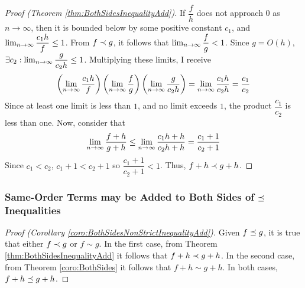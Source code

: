 \begin{proof}[Proof (Theorem \ref{thm:BothSidesInequalityAdd})]
	If $\dfrac{f}{h}$ does not approach $0$ as $n \to \infty$, then it is bounded below by some positive constant $c_1$, and $\lim_{n \to \infty} \dfrac{c_1 h}{f} \leq 1$. From $f \prec g$, it follows that $\lim_{n \to \infty} \dfrac{f}{g} < 1$. Since $g = O(h)$, $\exists c_2 : \lim_{n \to \infty} \dfrac{g}{c_2 h} \leq 1$. Multiplying these limits, I receive
	\begin{align*}
	\left( \lim_{n \to \infty} \frac{c_1 h}{f} \right) \left( \lim_{n \to \infty} \dfrac{f}{g} \right) \left( \lim_{n \to \infty} \dfrac{g}{c_2 h} \right) = \lim_{n \to \infty} \frac{c_1 h}{c_2 h} = \frac{c_1}{c_2}
	\end{align*}
	Since at least one limit is less than $1$, and no limit exceeds $1$, the product $\dfrac{c_1}{c_2}$ is less than one. Now, consider that
	\begin{align*}
	\lim_{n \to \infty} \frac{f + h}{g + h} \leq \lim_{n \to \infty} \frac{c_1 h + h}{c_2 h + h} = \frac{c_1 + 1}{c_2 + 1}
	\end{align*}
	Since $c_1 < c_2$, $c_1 + 1 < c_2 + 1$ so $\dfrac{c_1 + 1}{c_2 + 1} < 1$. Thus, $f + h \prec g + h$.
\end{proof}

\subsubsection{Same-Order Terms may be Added to Both Sides of $\preceq$ Inequalities}

\begin{proof}[Proof (Corollary \ref{coro:BothSidesNonStrictInequalityAdd})]
	Given $f \preceq g$, it is true that either $f \prec g$ or $f \sim g$. In the first case, from Theorem \ref{thm:BothSidesInequalityAdd} it follows that $f + h \prec g + h$. In the second case, from Theorem \ref{coro:BothSides} it follows that $f + h \sim g + h$. In both cases, $f + h \preceq g + h$.
\end{proof}
